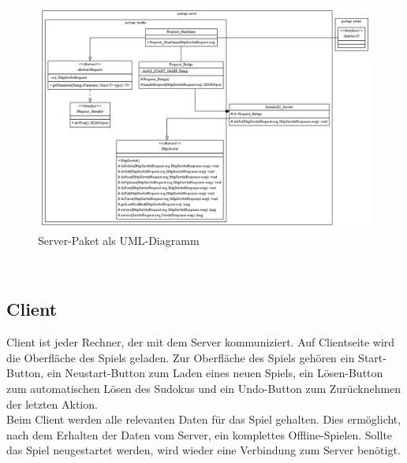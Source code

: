 \documentclass[a4paper,12pt]{scrreprt}
\begin{document}
	\begin{figure}
		\includegraphics[scale=0.55]{pictures/controller}
		\caption{Server-Paket als UML-Diagramm}
	\end{figure}\medskip \\

	\subsection{Client}
	Client ist jeder Rechner, der mit dem Server kommuniziert. Auf Clientseite wird die Oberfl\"ache des
	Spiels geladen. Zur Oberfl\"ache des Spiels geh\"oren ein Start-Button, ein Neustart-Button zum
	Laden eines neuen Spiels, ein L\"osen-Button zum automatischen L\"osen des Sudokus und ein
	Undo-Button zum Zur\"ucknehmen der letzten Aktion.\medskip \\
	Beim Client werden alle relevanten Daten f\"ur das Spiel gehalten. Dies ermöglicht, nach dem
	Erhalten der Daten vom Server, ein komplettes Offline-Spielen. Sollte das Spiel neugestartet werden,
	wird wieder eine Verbindung zum Server ben\"otigt.
\end{document}
